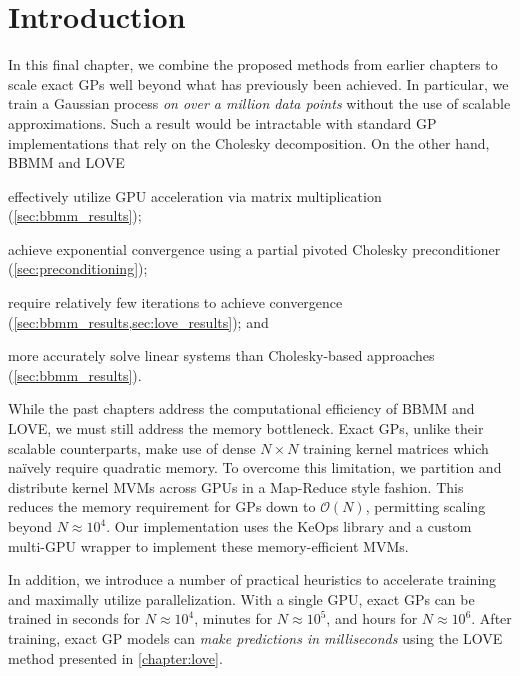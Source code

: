 \section{Introduction}


In this final chapter, we combine the proposed methods from earlier chapters to scale exact GPs well beyond what has previously been achieved.
In particular, we train a Gaussian process \emph{on over a million data points} without the use of scalable approximations.
Such a result would be intractable with standard GP implementations that rely on the Cholesky decomposition.
On the other hand, BBMM and LOVE
\begin{enumerate*}
  \item effectively utilize GPU acceleration via matrix multiplication (\cref{sec:bbmm_results});
  \item achieve exponential convergence using a partial pivoted Cholesky preconditioner (\cref{sec:preconditioning});
  \item require relatively few iterations to achieve convergence (\cref{sec:bbmm_results,sec:love_results}); and
  \item more accurately solve linear systems than Cholesky-based approaches (\cref{sec:bbmm_results}).
\end{enumerate*}

While the past chapters address the computational efficiency of BBMM and LOVE, we must still address the memory bottleneck.
Exact GPs, unlike their scalable counterparts, make use of dense $N \times N$ training kernel matrices which na\"ively require quadratic memory.
To overcome this limitation, we partition and distribute kernel MVMs across GPUs in a Map-Reduce style fashion.
This reduces the memory requirement for GPs down to $\mathcal{O}(N)$, permitting scaling beyond $N\approx 10^4$.
Our implementation uses the KeOps library \cite{charlier2020kernel} and a custom multi-GPU wrapper to implement these memory-efficient MVMs.

In addition, we introduce a number of practical heuristics to accelerate training and maximally utilize parallelization.
With a single GPU, exact GPs can be trained in seconds for $N \approx 10^4$, minutes for $N \approx 10^5$, and hours for $N \approx 10^6$.
After training, exact GP models can \emph{make predictions in milliseconds} using the LOVE method presented in \cref{chapter:love}.




